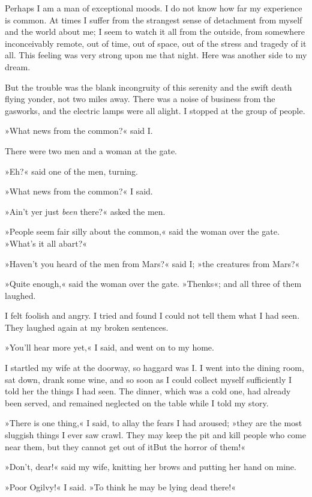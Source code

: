 Perhaps I am a man of exceptional moods. I do not know how far my experience is common. At times I suffer from the strangest sense of detachment from myself and the world about me; I seem to watch it all from the outside, from somewhere inconceivably remote, out of time, out of space, out of the stress and tragedy of it all. This feeling was very strong upon me that night. Here was another side to my dream.

But the trouble was the blank incongruity of this serenity and the swift death flying yonder, not two miles away. There was a noise of business from the gasworks, and the electric lamps were all alight. I stopped at the group of people.

»What news from the common?« said I\@.

There were two men and a woman at the gate.

»Eh?« said one of the men, turning.

»What news from the common?« I said.

»Ain't yer just \textit{been} there?« asked the men.

»People seem fair silly about the common,« said the woman over the gate. »What's it all abart?«

»Haven't you heard of the men from Mars?« said I; »the creatures from Mars?«

»Quite enough,« said the woman over the gate. »Thenks«; and all three of them laughed.

I felt foolish and angry. I tried and found I could not tell them what I had seen. They laughed again at my broken sentences.

»You'll hear more yet,« I said, and went on to my home.

I startled my wife at the doorway, so haggard was I\@. I went into the dining room, sat down, drank some wine, and so soon as I could collect myself sufficiently I told her the things I had seen. The dinner, which was a cold one, had already been served, and remained neglected on the table while I told my story.

»There is one thing,« I said, to allay the fears I had aroused; »they are the most sluggish things I ever saw crawl. They may keep the pit and kill people who come near them, but they cannot get out of it\textellipsis But the horror of them!«

»Don't, dear!« said my wife, knitting her brows and putting her hand on mine.

»Poor Ogilvy!« I said. »To think he may be lying dead there!«

